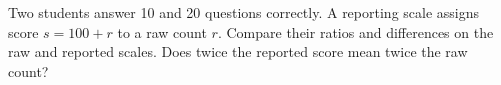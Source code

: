 Two students answer 10 and 20 questions correctly. A reporting scale assigns score $s=100+r$ to a raw count $r$. Compare their ratios and differences on the raw and reported scales. Does twice the reported score mean twice the raw count?
